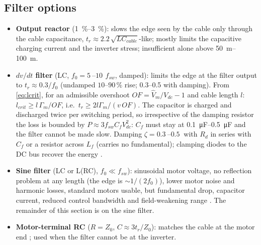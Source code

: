 \documentclass[10pt,a4paper]{scrartcl}
\newcommand{\Vdc}{V_{dc}}
\newcommand{\fsw}{f_{sw}}
\newcommand{\Cf}{C_{f}}
\newcommand{\Lf}{L_{f}}
\begin{document}
\begin{onehalfspace}
\subsection{Filter options}
\begin{itemize}
\item \textbf{Output reactor} (\SIrange{1}{3}{\percent}): slows the edge seen by the cable only through the cable capacitance, $t_r \approx 2.2\,\sqrt{L C_{cable}}$-like; mostly limits the capacitive charging current and the inverter stress; insufficient alone above \SIrange{50}{100}{m}.
\item \textbf{$dv/dt$ filter} (LC, $f_0 = \SIrange{5}{10}{}\,\fsw$, damped): limits the edge at the filter output to $t_r \approx 0.3/f_0$ (undamped $10$--$90\,\%$ rise; \SIrange{0.3}{0.5}{} with damping). From \eqref{eq:lcrit}, for an admissible overshoot $OF = \hat V_m/\Vdc - 1$ and cable length $l$: $l_{crit} \ge l\,\Gamma_m/OF$, i.e.\ $t_r \ge 2 l \Gamma_m/(v\,OF)$. The capacitor is charged and discharged twice per switching period, so irrespective of the damping resistor the loss is bounded by $P \approx 3\fsw\Cf\Vdc^2$: $\Cf$ must stay at \SIrange{0.1}{0.5}{\micro F} and the filter cannot be made slow. Damping $\zeta = \SIrange{0.3}{0.5}{}$ with $R_d$ in series with $\Cf$ or a resistor across $\Lf$ (carries no fundamental); clamping diodes to the DC bus recover the energy \cite{finlayson1998,vonjouanne1997}.
\item \textbf{Sine filter} (LC or L(RC), $f_0 \ll \fsw$): sinusoidal motor voltage, no reflection problem at any length (the edge is $\sim 1/(2f_0)$), lower motor noise and harmonic losses, standard motors usable, but fundamental drop, capacitor current, reduced control bandwidth and field-weakening range \cite{steinke1999,finlayson1998,salomaki2008}. The remainder of this section is on the sine filter.
\item \textbf{Motor-terminal RC} ($R = Z_0$, $C \approx 3 t_r/Z_0$): matches the cable at the motor end \cite{vonjouanne1996}; used when the filter cannot be at the inverter.
\end{itemize}


\end{onehalfspace}
\end{document}
